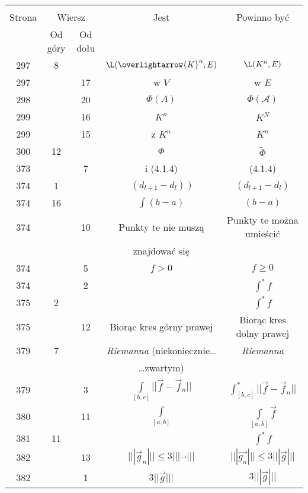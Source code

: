 \documentclass[a4paper,11pt]{article}
\newcommand{\ola}{\overlightarrow}
\begin{document}
\begin{center}
  \begin{tabular}{|c|c|c|c|c|}
    \hline
    & \multicolumn{2}{c|}{} & & \\
    Strona & \multicolumn{2}{c|}{Wiersz}& Jest & Powinno być \\ \cline{2-3}
    & Od góry & Od dołu &  &  \\ \hline
    297 &  8 & & $\L( \ola{ K }^{ n }, E )$ & $\L( K^{ n }, E )$ \\
    297 & & 17 & w $V$ & w $E$ \\
    298 & & 20 & $\Phi( A )$ & $\Phi( \mathcal{A} )$ \\
    299 & & 16 & $K^{ n }$ & $K^{ N }$ \\
    299 & & 15 & z $K^{ n }$ & $K^{ n }$ \\
    300 & 12 & & $\Phi$ & $\tilde{ \Phi }$ \\
    373 & &  7 & i (4.1.4) & (4.1.4) \\
    374 &  1 & & $( d_{ l + 1 } - d_{ l } )\; )$
           & $( d_{ l + 1 } - d_{ l } )$ \\
    374 & 16 & & $\int ( b - a )$ & $( b - a )$ \\
    374 & & 10 & Punkty te nie muszą & Punkty te można umieścić \\
    & & & znajdować się & \\
    374 & &  5 & $f > 0$ & $f \geq 0$ \\
    374 & &  2 & & $\int^{ * } \! f$ \\
    375 &  2 & & & $\int^{ * } \! f$ \\
    375 & & 12 & Biorąc kres górny prawej & Biorąc kres dolny prawej \\
    379 &  7 & & \emph{Riemanna} (niekoniecznie\ldots & \emph{Riemanna} \\
    & & &  \ldots zwartym) & \\
    379 & &  3 & $\int\limits_{ [ b, c ]  } || \vec{ f }
                 - \vec{ f }_{ n } ||$
           & $\int^{ * }_{ [ b, c ]  } || \vec{ f } - \vec{ f }_{ n } ||$ \\
    380 & & 11 & $\int\limits_{ [ a, b ] }$ & $\int\limits_{ [ a, b ] }
                                              \vec{ f } $ \\
    381 & 11 & & & $\int^{ * } \! f$ \\
    382 & & 13 & $||| \vec g_{ n } ||| \leq 3 ||| \vec{ \; \; } |||$
           & $||| \vec{ g_{ n } } ||| \leq 3 ||| \vec{ g } |||$ \\
    382 & &  1 & $3 || \vec{ g } |||$ & $3 ||| \vec{ g } |||$ \\

\end{tabular}
\end{center}
\end{document}
